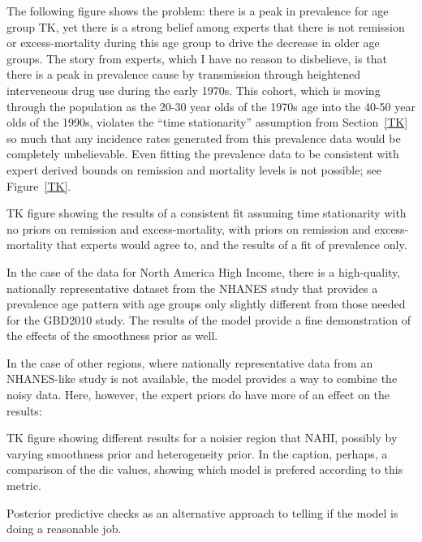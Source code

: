 The following figure shows the problem:  there is a peak in prevalence
for age group TK, yet there is a strong belief among experts that
there is not remission or excess-mortality during this age group to
drive the decrease in older age groups.  The story from experts, which
I have no reason to disbelieve, is that there is a peak in prevalence
cause by transmission through heightened interveneous drug use during
the early 1970s.  This cohort, which is moving through the population
as the 20-30 year olds of the 1970s age into the 40-50 year olds of
the 1990s, violates the ``time stationarity'' assumption from
Section~\ref{TK} so much that any incidence rates generated from this
prevalence data would be completely unbelievable.  Even fitting the
prevalence data to be consistent with expert derived bounds on
remission and mortality levels is not possible; see Figure~\ref{TK}.

TK figure showing the results of a consistent fit assuming time
stationarity with no priors on remission and excess-mortality, with
priors on remission and excess-mortality that experts would agree to,
and the results of a fit of prevalence only.

In the case of the data for North America High Income, there is a
high-quality, nationally representative dataset from the NHANES study
that provides a prevalence age pattern with age groups only slightly
different from those needed for the GBD2010 study.  The results of the
model provide a fine demonstration of the effects of the smoothness
prior as well.

In the case of other regions, where nationally representative data
from an NHANES-like study is not available, the model provides a way
to combine the noisy data.  Here, however, the expert priors do have
more of an effect on the results:

TK figure showing different results for a noisier region that NAHI,
possibly by varying smoothness prior and heterogeneity prior.  In the
caption, perhaps, a comparison of the dic values, showing which model
is prefered according to this metric.

Posterior predictive checks as an alternative approach to telling if
the model is doing a reasonable job.

